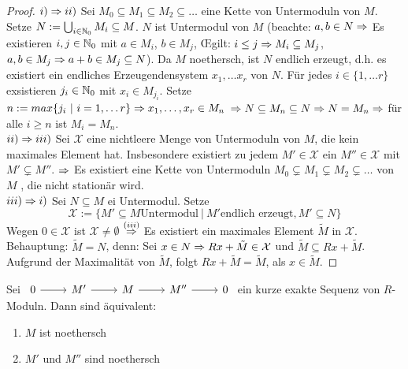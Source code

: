 	\begin{proof} 
		$i) \Rightarrow ii)$ Sei $M_0 \subseteq M_1 \subseteq M_2 \subseteq \dots $ eine Kette von Untermoduln von $M$. Setze $N := \bigcup_{i \in \mathbb{N}_0} M_i \subseteq M$. $N$ ist Untermodul von $M$ (beachte: $ a,b \in N \Rightarrow $ Es existieren $i,j \in \mathbb{N}_0$ mit $a \in M_i$, $b \in M_j$, \OE gilt: $i\leq j \Rightarrow M_i \subseteq M_j$, $a,b \in M_j \Rightarrow a+b \in M_j \subseteq N$). Da $M$ noethersch, ist $N$ endlich erzeugt, d.h. es existiert ein endliches Erzeugendensystem $x_1, \dots x_r$ von $N$. Für jedes $i \in \{1,\dots r\} $ exsistieren $j_i \in \mathbb{N}_0 $ mit $x_i \in M_{j_i}$. Setze $n:= max\{j_i \ | \ i = 1, \dots r \} \Rightarrow x_1,\dots, x_r \in M_n$ $ \Rightarrow N \subseteq M_n \subseteq N \Rightarrow N = M_n \Rightarrow $ für alle $i \geq n $ ist $ M _i=M_n$.\\
		$ii) \Rightarrow iii)$ Sei $\mathcal{X}$ eine nichtleere Menge von Untermoduln von $M$, die kein maximales Element hat. Insbesondere existiert zu jedem $ M' \in \mathcal{X} $ ein $M'' \in \mathcal{X} $ mit $M' \subsetneq M''$. $\Rightarrow$ Es existiert eine Kette von Untermoduln $M_0 \subsetneq M_1 \subsetneq M_2 \subsetneq \dots $ von $M$ , die nicht stationär wird.\\
		$iii) \Rightarrow i)$ Sei $N \subseteq M $ ei Untermodul. Setze $$\mathcal{X} := \{M' \subseteq M \text {Untermodul} \ | \ M' \text{endlich erzeugt}, M' \subseteq N\}$$Wegen $0 \in \mathcal{X}$ ist $\mathcal{X} \neq \emptyset $ $\overset{(iii)}{\Rightarrow}$ Es existiert ein maximales Element $\tilde{M} $ in $\mathcal{X}$. \\
		Behauptung: $\tilde{M} = N$, denn: Sei $ x \in N \Rightarrow Rx+\tilde{M} \in \mathcal{X} $ und $ \tilde{M} \subseteq Rx+\tilde{M}$. Aufgrund der Maximalität von $\tilde{M}$, folgt $Rx+\tilde{M} = \tilde{M}$, als $x \in \tilde{M}$.
	\end{proof}
\begin{bem}\label{3.4}
	Sei $\begin{tikzcd}
	0  \arrow{r} & M' \arrow{r} & M \arrow{r} & M'' \arrow{r} & 0
	\end{tikzcd} $ ein kurze exakte Sequenz von $R$-Moduln. Dann sind äquivalent: 
	\begin{enumerate} [label= \roman*)]
		\item $M$ ist noethersch
		\item $M'$ und $M''$ sind noethersch
	\end{enumerate}
\end{bem}
